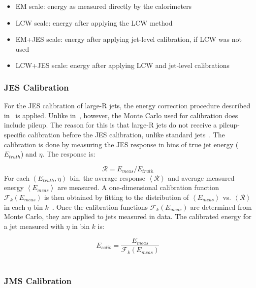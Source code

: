 \begin{itemize}
    \item EM scale: energy as measured directly by the calorimeters
    \item LCW scale: energy after applying the LCW method
    \item EM+JES scale: energy after applying jet-level calibration, if LCW was not used
    \item LCW+JES scale: energy after applying LCW and jet-level calibrations
\end{itemize}

\subsubsection{JES Calibration}\label{subsubsec:jes_calibration}

For the JES calibration of large-R jets, the energy correction procedure described in~\cite{jet-energy-measurement} is applied.
Unlike in~\cite{jet-energy-measurement}, however, the Monte Carlo used for calibration does include pileup.
The reason for this is that large-R jets do not receive a pileup-specific calibration before the JES calibration, unlike standard jets~\cite{jet-substructure-perf}.
The calibration is done by measuring the JES response in bins of true jet energy ($E_{truth}$) and $\eta$.
The response is:

\begin{equation}\label{eq:jet_jes_response}
    \mathcal{R} = E_{meas} / E_{truth}
\end{equation}
For each $\left(E_{truth}, \eta\right)$ bin, the average response $\left<\mathcal{R}\right>$
and average measured energy $\left<E_{meas}\right>$ are measured.
A one-dimensional calibration function $\mathcal{F}_k\left(E_{meas}\right)$ is then obtained by fitting to the distribution of $\left<E_{meas}\right>$ vs. $\left<\mathcal{R}\right>$ in each $\eta$ bin $k$~\cite{jet-energy-measurement}.
Once the calibration functions $\mathcal{F}_k(E_{meas})$ are determined from Monte Carlo, they are applied to jets measured in data.
The calibrated energy for a jet measured with $\eta$ in bin $k$ is:

\begin{equation}\label{eq:jet_jes_calibration}
    E_{calib} = \frac{E_{meas}}{\mathcal{F}_k\left(E_{meas}\right)}
\end{equation}~\cite{jet-energy-measurement}

\subsubsection{JMS Calibration}\label{subsubsec:jms_calibration}


